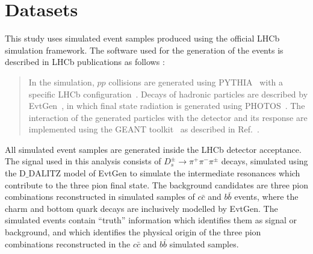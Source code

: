 \section{Datasets}
This study uses simulated event samples produced using the official LHCb simulation framework.
The software used for the generation of the events is described in LHCb publications as follows :

\begin{quote}
In the simulation, $pp$ collisions are generated using
PYTHIA~\cite{Sjostrand:2006za} 
with a specific LHCb configuration~\cite{LHCb-PROC-2010-056}.  Decays of hadronic particles
are described by EvtGen~\cite{Lange:2001uf}, in which final state
radiation is generated using PHOTOS~\cite{Golonka:2005pn}. The
interaction of the generated particles with the detector and its
response are implemented using the GEANT
toolkit~\cite{Allison:2006ve, Agostinelli:2002hh} as described in
Ref.~\cite{LHCb-PROC-2011-006}.
\end{quote}

All simulated event samples are generated inside the LHCb detector acceptance.
The signal used in this analysis consists of $D_s^\pm\to\pi^+\pi^-\pi^\pm$ decays, simulated
using the $\textrm{D}\_\textrm{DALITZ}$ model of EvtGen to simulate the intermediate resonances which contribute to the
three pion final state. The background candidates are three pion combinations reconstructed in
simulated samples of $c\bar{c}$ and $b\bar{b}$ events, where the charm and bottom quark decays are
inclusively modelled by EvtGen. The simulated events contain ``truth'' information which identifies them as
signal or background, and which identifies the physical origin of the three pion combinations reconstructed
in the $c\bar{c}$ and $b\bar{b}$ simulated samples.
